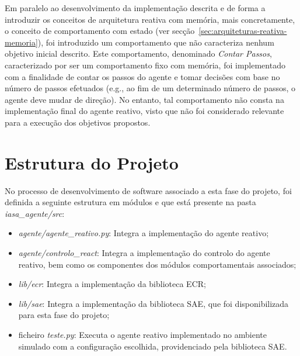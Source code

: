 Em paralelo ao desenvolvimento da implementação descrita e de forma a introduzir os conceitos de arquitetura reativa com memória, mais concretamente, o conceito de comportamento com estado (ver secção~\ref{sec:arquiteturas-reativa-memoria}), foi introduzido um comportamento que não caracteriza nenhum objetivo inicial descrito.
Este comportamento, denominado \textit{Contar Passos}, caracterizado por ser um comportamento fixo com memória, foi implementado com a finalidade de contar os passos do agente e tomar decisões com base no número de passos efetuados (e.g., ao fim de um determinado número de passos, o agente deve mudar de direção).
No entanto, tal comportamento não consta na implementação final do agente reativo, visto que não foi considerado relevante para a execução dos objetivos propostos.


\section{Estrutura do Projeto}\label{sec:estrutura-do-projeto-2}

No processo de desenvolvimento de software associado a esta fase do projeto, foi definida a seguinte estrutura em módulos e que está presente na pasta \textit{iasa\_agente/src}:

\begin{itemize}
    \item \textit{agente/agente\_reativo.py}: Integra a implementação do agente reativo;
    \item \textit{agente/controlo\_react}: Integra a implementação do controlo do agente reativo, bem como os componentes dos módulos comportamentais associados;
    \item \textit{lib/ecr}: Integra a implementação da biblioteca ECR;
    \item \textit{lib/sae}: Integra a implementação da biblioteca SAE, que foi disponibilizada para esta fase do projeto;
    \item ficheiro \textit{teste.py}: Executa o agente reativo implementado no ambiente simulado com a configuração escolhida, providenciado pela biblioteca SAE.
\end{itemize}
